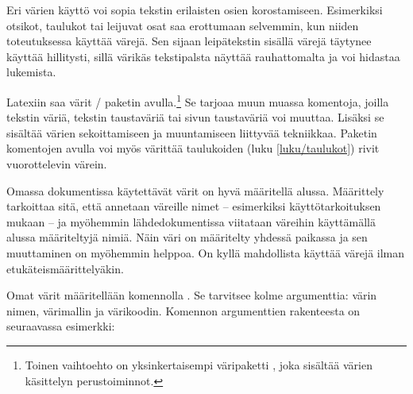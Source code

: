 Eri värien käyttö voi sopia tekstin erilaisten osien korostamiseen.
Esimerkiksi otsikot, taulukot tai leijuvat osat saa erottumaan
selvemmin, kun niiden toteutuksessa käyttää värejä. Sen sijaan
leipätekstin sisällä värejä täytynee käyttää hillitysti, sillä värikäs
tekstipalsta näyttää rauhattomalta ja voi hidastaa lukemista.

Latexiin saa värit \-/ paketin
avulla.\footnote{Toinen vaihtoehto on yksinkertaisempi väripaketti
  , joka sisältää värien käsittelyn perustoiminnot.} Se
tarjoaa muun muassa komentoja, joilla tekstin väriä, tekstin taustaväriä
tai sivun taustaväriä voi muuttaa. Lisäksi se sisältää värien
sekoittamiseen ja muuntamiseen liittyvää tekniikkaa. Paketin komentojen
avulla voi myös värittää taulukoiden (luku \ref{luku/taulukot}) rivit
vuorottelevin värein.

Omassa dokumentissa käytettävät värit on hyvä määritellä alussa.
Määrittely tarkoittaa sitä, että annetaan väreille nimet -- esimerkiksi
käyttötarkoituksen mukaan -- ja myöhemmin lähdedokumentissa viitataan
väreihin käyttämällä alussa määriteltyjä nimiä. Näin väri on määritelty
yhdessä paikassa ja sen muuttaminen on myöhemmin helppoa. On kyllä
mahdollista käyttää värejä ilman etukäteismäärittelyäkin.


Omat värit määritellään komennolla . Se tarvitsee
kolme argumenttia: värin nimen, värimallin ja värikoodin. Komennon
argumenttien rakenteesta on seuraavassa esimerkki:

\begin{koodilohkosis}
\end{koodilohkosis}

